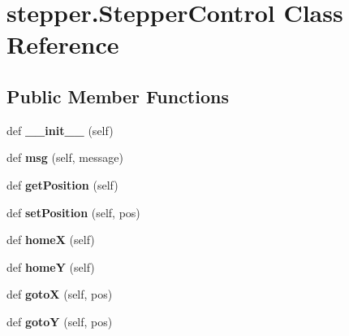 \hypertarget{classstepper_1_1_stepper_control}{}\section{stepper.\+Stepper\+Control Class Reference}
\label{classstepper_1_1_stepper_control}
\subsection*{Public Member Functions}
\begin{DoxyCompactItemize}
\item 
def {\bfseries \+\_\+\+\_\+init\+\_\+\+\_\+} (self)\hypertarget{classstepper_1_1_stepper_control_a9da54e50265bfda0d3f8545e3f2e7bfc}{}\label{classstepper_1_1_stepper_control_a9da54e50265bfda0d3f8545e3f2e7bfc}

\item 
def {\bfseries msg} (self, message)\hypertarget{classstepper_1_1_stepper_control_aa8dc51da2ee0fb7516b6387af022c54b}{}\label{classstepper_1_1_stepper_control_aa8dc51da2ee0fb7516b6387af022c54b}

\item 
def {\bfseries get\+Position} (self)\hypertarget{classstepper_1_1_stepper_control_a167fb65d8b1fcfe526814be53ebfb90c}{}\label{classstepper_1_1_stepper_control_a167fb65d8b1fcfe526814be53ebfb90c}

\item 
def {\bfseries set\+Position} (self, pos)\hypertarget{classstepper_1_1_stepper_control_a7e09779dfbb8f133108585172825ad7e}{}\label{classstepper_1_1_stepper_control_a7e09779dfbb8f133108585172825ad7e}

\item 
def {\bfseries homeX} (self)\hypertarget{classstepper_1_1_stepper_control_ae85703b3df24016a6764e44b62c5d558}{}\label{classstepper_1_1_stepper_control_ae85703b3df24016a6764e44b62c5d558}

\item 
def {\bfseries homeY} (self)\hypertarget{classstepper_1_1_stepper_control_a8be471a3eff314d54f89c1dfe5cd5762}{}\label{classstepper_1_1_stepper_control_a8be471a3eff314d54f89c1dfe5cd5762}

\item 
def {\bfseries gotoX} (self, pos)\hypertarget{classstepper_1_1_stepper_control_ab5f6f529f7e1ad7eaec1ccd71e126b4f}{}\label{classstepper_1_1_stepper_control_ab5f6f529f7e1ad7eaec1ccd71e126b4f}

\item 
def {\bfseries gotoY} (self, pos)\hypertarget{classstepper_1_1_stepper_control_a32fc69a38aca1503e8f8f0f35ccf4228}{}\label{classstepper_1_1_stepper_control_a32fc69a38aca1503e8f8f0f35ccf4228}


\end{DoxyCompactItemize}
